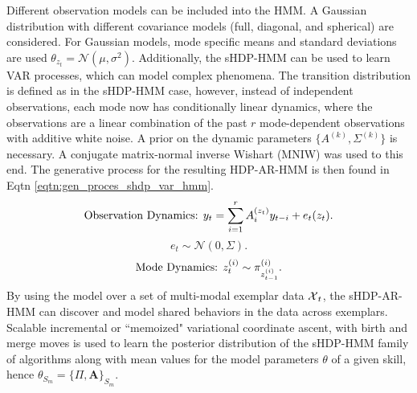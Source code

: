 \documentclass[letterpaper, 10 pt, conference]{ieeeconf}  %
\begin{document}
Different observation models can be included into the HMM. A Gaussian distribution with different covariance models (full, diagonal, and spherical) are considered. For Gaussian models, mode specific means and standard deviations are used $\theta_{z_t}=\mathcal{N}(\mu,\sigma^2)$. 
Additionally, the sHDP-HMM can be used to learn VAR processes, which can model complex phenomena. The transition distribution is defined as in the sHDP-HMM case, however, instead of independent observations, each mode now has conditionally linear dynamics, where the observations are a linear combination of the past $r$ mode-dependent observations with additive white noise. A prior on the dynamic parameters $\{ A^{(k)}, \Sigma^{(k)} \}$ is necessary. A conjugate matrix-normal inverse Wishart (MNIW) was used to this end. The generative process for the resulting HDP-AR-HMM is then found in Eqtn \ref{eqtn:gen_proces_shdp_var_hmm}.
\begin{equation}
    \mbox{Observation Dynamics: }\\ 
    	y_t=\sum_{i=1}^r A_i^{(z_t)} y_{t-i} + e_t(z_t). \nonumber
        \label{eqtn:gen_proces_shdp_var_hmm}
\end{equation}
\begin{equation}
	e_t \sim \mathcal{N}(0,\Sigma).
\end{equation}
\begin{equation}
	\mbox{Mode Dynamics: }\\
    	z_t^{(i)} \sim \pi_{z_{t-1}^{(i)}}^{(i)}. \nonumber
\end{equation}
By using the model over a set of multi-modal exemplar data $\mbox{$\mathcal X$}_t$, the sHDP-AR-HMM can discover and model shared behaviors in the data across exemplars. Scalable incremental or ``memoized" variational coordinate ascent, with birth and merge moves \cite{2014AOAS-Fox-JointModel_MutlipleTimeSeries_BetaProcess_MotionCapture} is used to learn the posterior distribution of the sHDP-HMM family of algorithms along with mean values for the model parameters $\theta$ of a given skill, hence $\theta_{S_m}=\{\Pi,\textbf{A}\}_{S_m}$.
\end{document}
